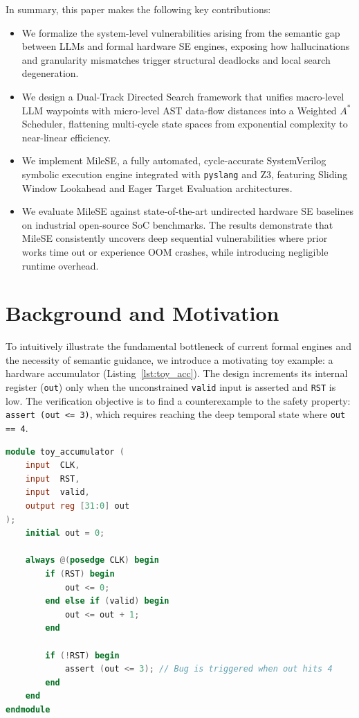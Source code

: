 \documentclass[conference]{IEEEtran}
\begin{document}
In summary, this paper makes the following key contributions:
\begin{itemize}
    \item We formalize the system-level vulnerabilities arising from the semantic gap between LLMs and formal hardware SE engines, exposing how hallucinations and granularity mismatches trigger structural deadlocks and local search degeneration.
    \item We design a Dual-Track Directed Search framework that unifies macro-level LLM waypoints with micro-level AST data-flow distances into a Weighted $A^*$ Scheduler, flattening multi-cycle state spaces from exponential complexity to near-linear efficiency.
    \item We implement MileSE, a fully automated, cycle-accurate SystemVerilog symbolic execution engine integrated with \texttt{pyslang} and Z3, featuring Sliding Window Lookahead and Eager Target Evaluation architectures.
    \item We evaluate MileSE against state-of-the-art undirected hardware SE baselines on industrial open-source SoC benchmarks. The results demonstrate that MileSE consistently uncovers deep sequential vulnerabilities where prior works time out or experience OOM crashes, while introducing negligible runtime overhead.
\end{itemize}

\section{Background and Motivation}
\label{sec:motivation}

To intuitively illustrate the fundamental bottleneck of current formal engines and the necessity of semantic guidance, we introduce a motivating toy example: a hardware accumulator (Listing~\ref{lst:toy_acc}). The design increments its internal register (\texttt{out}) only when the unconstrained \texttt{valid} input is asserted and \texttt{RST} is low. The verification objective is to find a counterexample to the safety property: \texttt{assert (out <= 3)}, which requires reaching the deep temporal state where \texttt{out == 4}.

\begin{lstlisting}[language=Verilog, caption={Toy Accumulator Example}, label={lst:toy_acc}]
module toy_accumulator (
    input  CLK,
    input  RST,
    input  valid,
    output reg [31:0] out 
);
    initial out = 0;

    always @(posedge CLK) begin
        if (RST) begin
            out <= 0;
        end else if (valid) begin
            out <= out + 1;
        end
        
        if (!RST) begin
            assert (out <= 3); // Bug is triggered when out hits 4
        end
    end
endmodule
\end{lstlisting}
\end{document}
